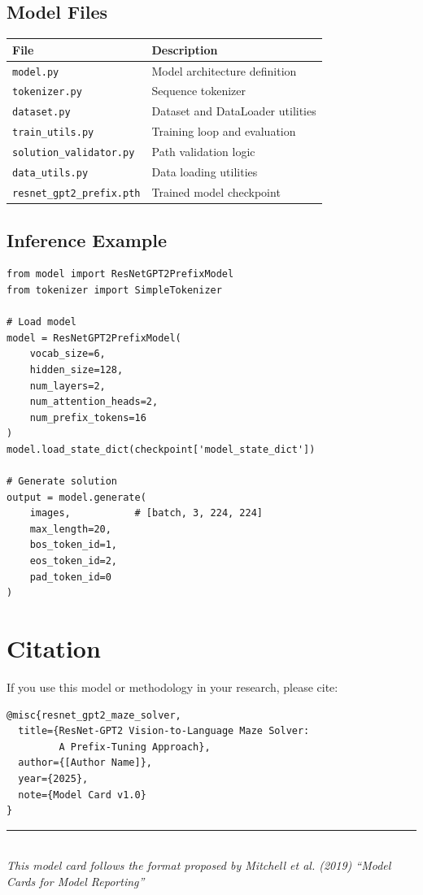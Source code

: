 \documentclass[11pt,a4paper]{article}
\begin{document}
\subsection{Model Files}

\begin{center}
\begin{tabular}{ll}
\toprule
\textbf{File} & \textbf{Description} \\
\midrule
\texttt{model.py} & Model architecture definition \\
\texttt{tokenizer.py} & Sequence tokenizer \\
\texttt{dataset.py} & Dataset and DataLoader utilities \\
\texttt{train\_utils.py} & Training loop and evaluation \\
\texttt{solution\_validator.py} & Path validation logic \\
\texttt{data\_utils.py} & Data loading utilities \\
\texttt{resnet\_gpt2\_prefix.pth} & Trained model checkpoint \\
\bottomrule
\end{tabular}
\end{center}

\subsection{Inference Example}

\begin{verbatim}
from model import ResNetGPT2PrefixModel
from tokenizer import SimpleTokenizer

# Load model
model = ResNetGPT2PrefixModel(
    vocab_size=6,
    hidden_size=128,
    num_layers=2,
    num_attention_heads=2,
    num_prefix_tokens=16
)
model.load_state_dict(checkpoint['model_state_dict'])

# Generate solution
output = model.generate(
    images,           # [batch, 3, 224, 224]
    max_length=20,
    bos_token_id=1,
    eos_token_id=2,
    pad_token_id=0
)
\end{verbatim}

\section{Citation}

If you use this model or methodology in your research, please cite:

\begin{verbatim}
@misc{resnet_gpt2_maze_solver,
  title={ResNet-GPT2 Vision-to-Language Maze Solver: 
         A Prefix-Tuning Approach},
  author={[Author Name]},
  year={2025},
  note={Model Card v1.0}
}
\end{verbatim}

\vspace{1cm}
\begin{center}
\rule{0.5\textwidth}{0.5pt}\\[0.3cm]
{\small\textit{This model card follows the format proposed by Mitchell et al. (2019) ``Model Cards for Model Reporting''}}
\end{center}
\end{document}
